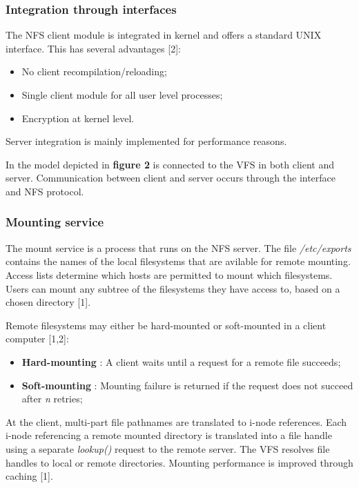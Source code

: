 \subsubsection{Integration through interfaces}

The NFS client module is integrated in kernel and offers a standard UNIX interface. This has several advantages [2]:
\begin{itemize}
	\item No client recompilation/reloading;
	\item Single client module for all user level processes;
	\item Encryption at kernel level.
\end{itemize}

Server integration is mainly implemented for performance reasons.

In the model depicted in \textbf{figure 2} is connected to the VFS in both client and server. Communication between client and server occurs through the interface and NFS protocol.


\subsubsection{Mounting service}

The mount service is a process that runs on the NFS server. The file \emph{/etc/exports} contains the names of the local filesystems that are avilable for remote mounting. Access lists determine which hosts are permitted to mount which filesystems. Users can mount any subtree of the filesystems they have access to, based on a chosen directory [1].

Remote filesystems may either be hard-mounted or soft-mounted in a client computer [1,2]:
\begin{itemize}
	\item \textbf{Hard-mounting} : A client waits until a request for a remote file succeeds;
	\item \textbf{Soft-mounting} : Mounting failure is returned if the request does not succeed after \textit{n} retries;
\end{itemize}

At the client, multi-part file pathnames are translated to i-node references. Each i-node referencing a remote mounted directory is translated into a file handle using a separate \textit{lookup()} request to the remote server. The VFS resolves file handles to local or remote directories. Mounting performance is improved through caching [1].


